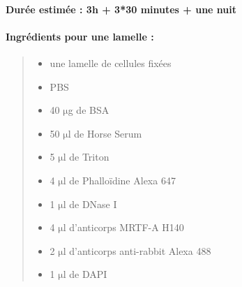 \documentclass{report}
\newcommand{\micro}{$\mathrm{\mu}$}
\begin{document}
\paragraph{Durée estimée : 3h + 3*30 minutes + une nuit }
 \paragraph{Ingrédients pour une lamelle : }
 \begin{quote}
 
 
 \begin{itemize}
 \item une lamelle de cellules fixées
 \item PBS
 \item 40 \micro g de BSA
 \item 50 \micro l de Horse Serum
 \item 5 \micro l de Triton
 \item 4 \micro l de Phalloïdine Alexa 647
 \item 1 \micro l de DNase I 
 \item 4 \micro l d'anticorps MRTF-A H140
 \item 2 \micro l d'anticorps anti-rabbit Alexa 488
 \item 1 \micro l de DAPI
 \end{itemize}
\end{quote}
\end{document}
